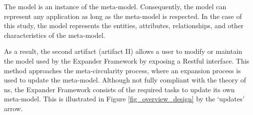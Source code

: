   The model is an instance of the meta-model. Consequently, the model can represent any
  application as long as the meta-model is respected. In the case of this study, the model
  represents the entities, attributes, relationships, and other characteristics of the
  meta-model.
  
  As a result, the second artifact (artifact II) allows a user to modify or maintain the
  model used by the Expander Framework by exposing a Restful interface. This method
  approaches the meta-circularity process, where an expansion process is used to
  update the meta-model. Although not fully compliant with the theory of \gls{ns}, the
  Expander Framework consists of the required tasks to update its own meta-model. This is
  illustrated in Figure \ref{fig_overview_design} by the \enquote*{updates} arrow.






